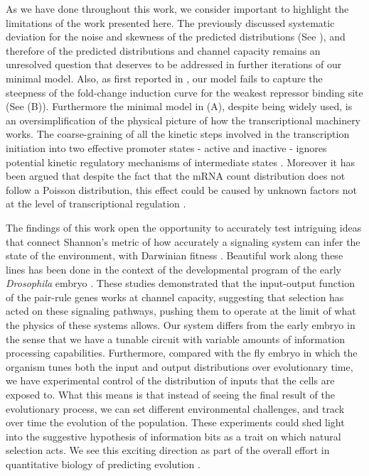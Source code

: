 As we have done throughout this work, we consider important to highlight the
limitations of the work presented here. The previously discussed systematic
deviation for the noise and skewness of the predicted distributions (See
), and therefore of the predicted distributions and
channel capacity remains an unresolved question that deserves to be addressed
in further iterations of our minimal model. Also, as first reported in
\cite{Razo-Mejia2018}, our model fails to capture the steepness of the
fold-change induction curve for the weakest repressor binding site (See
(B)). Furthermore the
minimal model in (A), despite being widely used, is an
oversimplification of the physical picture of how the transcriptional machinery
works. The coarse-graining of all the kinetic steps involved in the
transcription initiation into two effective promoter states - active and
inactive - ignores potential kinetic regulatory mechanisms of intermediate
states \cite{Scholes2017}. Moreover it has been argued that despite the fact
that the mRNA count distribution does not follow a Poisson distribution, this
effect could be caused by unknown factors not at the level of transcriptional
regulation \cite{Choubey2018}.

The findings of this work open the opportunity to accurately test intriguing
ideas that connect Shannon's metric of how accurately a signaling system can
infer the state of the environment, with Darwinian fitness \cite{Taylor2007}.
Beautiful work along these lines has been done in the context of the
developmental program of the early {\it Drosophila} embryo \cite{Tkacik2008,
Petkova2019}. These studies demonstrated that the input-output function of the
pair-rule genes works at channel capacity, suggesting that selection has acted
on these signaling pathways, pushing them to operate at the limit of what the
physics of these systems allows. Our system differs from the early embryo in
the sense that we have a tunable circuit with variable amounts of information
processing capabilities. Furthermore, compared with the fly embryo in which the
organism tunes both the input and output distributions over evolutionary time,
we have experimental control of the distribution of inputs that the cells are
exposed to. What this means is that instead of seeing the final result of the
evolutionary process, we can set different environmental challenges, and track
over time the evolution of the population. These experiments could shed light
into the suggestive hypothesis of information bits as a trait on which natural
selection acts. We see this exciting direction as part of the overall effort in
quantitative biology of predicting evolution \cite{Lassig2017}.